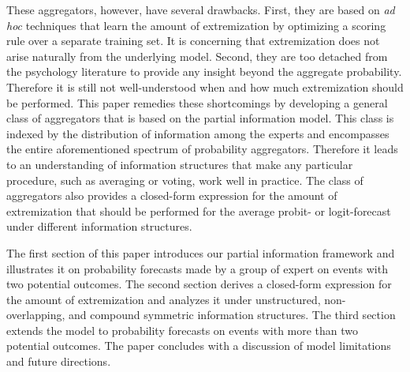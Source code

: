 \documentclass[11pt,twoside]{article}
\theoremstyle{definition}
\theoremstyle{definition}
\begin{document}
These aggregators, however, have several drawbacks. First, they are based on \textit{ad hoc} techniques that learn the amount of extremization by optimizing a scoring rule over a separate training set. It is concerning that extremization does not arise naturally from the underlying model. Second, they are too detached from the psychology literature to provide any insight beyond the aggregate probability. Therefore it is still not well-understood when and how much extremization should be performed. This paper remedies these shortcomings by developing a general class of aggregators that is based on the partial information model. This class is indexed by the distribution of information among the experts and encompasses the entire aforementioned spectrum of probability aggregators. Therefore it leads to an understanding of information structures that make any particular procedure, such as averaging or voting, work well in practice. The class of aggregators also provides a closed-form expression for the amount of extremization that should be performed for the average probit- or logit-forecast under different information structures. 




The first section of this paper introduces our partial information framework and illustrates  it on probability forecasts made by a group of expert on events with two potential outcomes. The second section derives a closed-form expression for the amount of extremization and analyzes it under unstructured, non-overlapping, and compound symmetric information structures. The third section extends the model to probability forecasts on events with more than two potential outcomes. The paper concludes with a discussion of  model limitations and future directions. 



\end{document}
